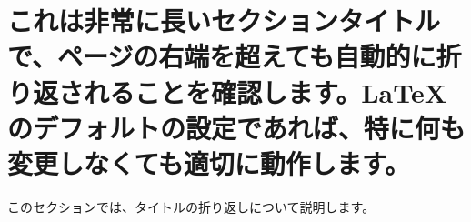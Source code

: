 \documentclass[a4paper,12pt]{jsarticle}
\begin{document}
\section{これは非常に長いセクションタイトルで、ページの右端を超えても自動的に折り返されることを確認します。LaTeXのデフォルトの設定であれば、特に何も変更しなくても適切に動作します。}

このセクションでは、タイトルの折り返しについて説明します。
\end{document}
